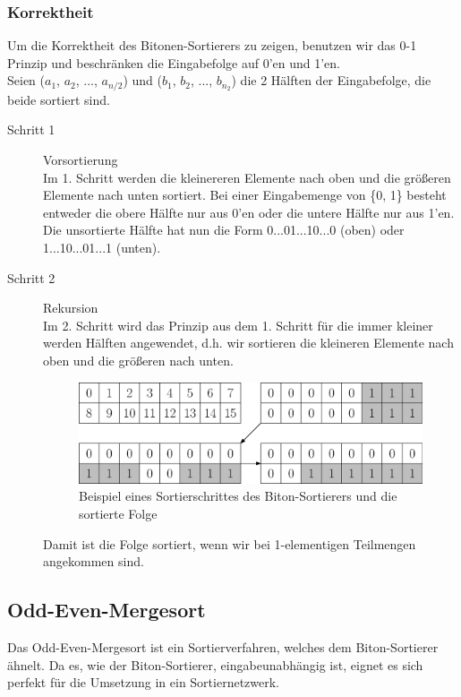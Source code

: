 \documentclass[11pt,ngerman]{article}
\begin{document}
\subsubsection{Korrektheit}
Um die Korrektheit des Bitonen-Sortierers zu zeigen, benutzen wir das 0-1 Prinzip und beschränken die Eingabefolge auf 0'en und 1'en.\\
Seien ($a_1$, $a_2$, ..., $a_{n/2}$) und ($b_1$, $b_2$, ..., $b_{n_2}$) die 2 Hälften der Eingabefolge, die beide sortiert sind.
\begin{description}
\item[Schritt 1] Vorsortierung\\Im 1. Schritt werden die kleinereren Elemente nach \glqq oben\grqq{} und die größeren Elemente nach \glqq unten\grqq{} sortiert. Bei einer Eingabemenge von \{0, 1\} besteht entweder die \glqq obere\grqq{} Hälfte nur aus 0'en oder die \grqq untere\grqq{} Hälfte nur aus 1'en.\\ Die unsortierte Hälfte hat nun die Form 0...01...10...0 (\glqq oben\grqq ) oder 1...10...01...1 (\glqq unten\grqq ).
\item[Schritt 2] \glqq Rekursion\grqq{}\\Im 2. Schritt wird das Prinzip aus dem 1. Schritt für die immer kleiner werden Hälften angewendet, d.h. wir sortieren die kleineren Elemente nach \grqq oben\grqq{} und die größeren nach \grqq unten\grqq{}.\\
\begin{figure}
\begin{center}
\includegraphics[scale=0.4]{korrektheitBS.eps}
\caption{Beispiel eines Sortierschrittes des Biton-Sortierers und die sortierte Folge}
\end{center}
\end{figure}
Damit ist die Folge sortiert, wenn wir bei 1-elementigen Teilmengen angekommen sind. 
\end{description}
\subsection{Odd-Even-Mergesort}
Das Odd-Even-Mergesort ist ein Sortierverfahren, welches dem Biton-Sortierer ähnelt. Da es, wie der Biton-Sortierer, eingabeunabhängig ist, eignet es sich perfekt für die Umsetzung in ein Sortiernetzwerk.
\end{document}
